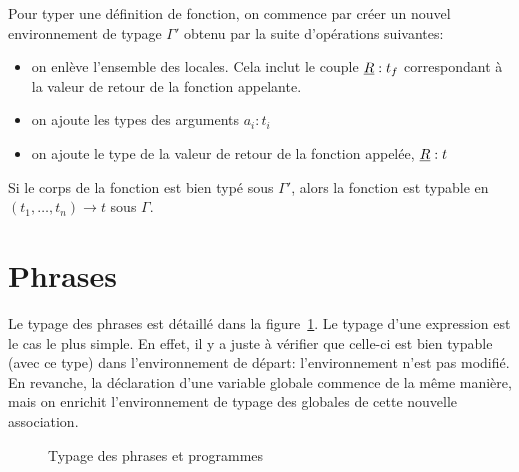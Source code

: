\begin{mathpar}
\end{mathpar}

Pour typer une définition de fonction, on commence par créer un nouvel
environnement de typage $Γ'$ obtenu par la suite d'opérations suivantes:

\begin{itemize}
\item
  on enlève l'ensemble des locales. Cela inclut le couple $\vRet : t_f$
  correspondant à la valeur de retour de la fonction appelante.
\item
  on ajoute les types des arguments $a_i : t_i$
\item
  on ajoute le type de la valeur de retour de la fonction appelée,
  $\vRet : t$
\end{itemize}

Si le corps de la fonction est bien typé sous $Γ'$, alors la fonction est
typable en $(t_1, …, t_n) → t$ sous $Γ$.

\begin{mathpar}
\end{mathpar}

\section{Phrases}

Le typage des phrases est détaillé dans la figure~\ref{fig:typ-ph}. Le typage
d'une expression est le cas le plus simple. En effet, il y a juste à vérifier
que celle-ci est bien typable (avec ce type) dans l'environnement de départ:
l'environnement n'est pas modifié. En revanche, la déclaration d'une variable
globale commence de la même manière, mais on enrichit l'environnement de typage
des globales de cette nouvelle association.

\begin{figure}[h]


  \begin{mathpar}

  \end{mathpar}

  \begin{mathpar}
  \end{mathpar}

  \caption{Typage des phrases et programmes}
\label{fig:typ-ph}

\end{figure}

